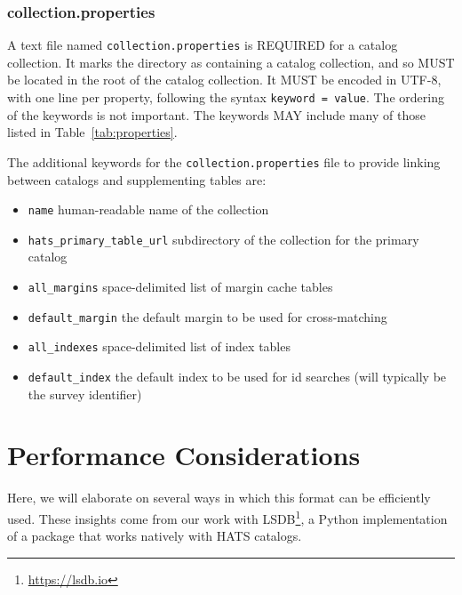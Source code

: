\documentclass[11pt,a4paper]{ivoa}
\begin{document}
\subsubsection{collection.properties}\label{sec:collectionProperties}
A text file named \texttt{collection.properties} is REQUIRED for a catalog collection.
It marks the directory as containing a catalog collection, and so MUST be located in the 
root of the catalog collection.
It MUST be encoded in UTF-8, with one line per property, following the syntax \texttt{keyword = value}.
The ordering of the keywords is not important. The keywords MAY include many of those listed in Table~\ref{tab:properties}.

The additional keywords for the \texttt{collection.properties} file to provide linking between catalogs and supplementing tables are:

\begin{itemize}
    \item \texttt{name} human-readable name of the collection
    \item \texttt{hats\_primary\_table\_url} subdirectory of the collection for the primary catalog
    \item \texttt{all\_margins} space-delimited list of margin cache tables
    \item \texttt{default\_margin} the default margin to be used for cross-matching
    \item \texttt{all\_indexes} space-delimited list of index tables
    \item \texttt{default\_index} the default index to be used for id searches (will typically be the survey identifier)
\end{itemize}

\section{Performance Considerations}
Here, we will elaborate on several ways in which this format can be efficiently used. These insights come from our work with LSDB\footnote{\url{https://lsdb.io}}, a Python implementation of a package that works natively with HATS catalogs. \par
\end{document}
